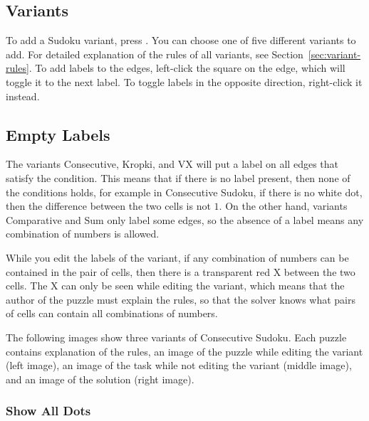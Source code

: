 
\subsection*{Variants}

To add a Sudoku variant, press .
You can choose one of five different variants to add.
For detailed explanation of the rules of all variants, see Section~\ref{sec:variant-rules}.
To add labels to the edges, left-click the square on the edge, which will toggle it to the next label.
To toggle labels in the opposite direction, right-click it instead.


\subsection*{Empty Labels}

The variants Consecutive, Kropki, and VX will put a label on all edges that satisfy the condition.
This means that if there is no label present, then none of the conditions holds,
for example in Consecutive Sudoku, if there is no white dot, then the difference between the two cells is not $1$.
On the other hand, variants Comparative and Sum only label some edges,
so the absence of a label means any combination of numbers is allowed.

While you edit the labels of the variant, if any combination of numbers can be contained in the pair of cells,
then there is a transparent red X between the two cells.
The X can only be seen while editing the variant, which means that the author of the puzzle must explain the rules,
so that the solver knows what pairs of cells can contain all combinations of numbers.

The following images show three variants of Consecutive Sudoku.
Each puzzle contains explanation of the rules, an image of the puzzle while editing the variant (left image),
an image of the task while not editing the variant (middle image), and an image of the solution (right image).

\subsubsection*{Show All Dots}


